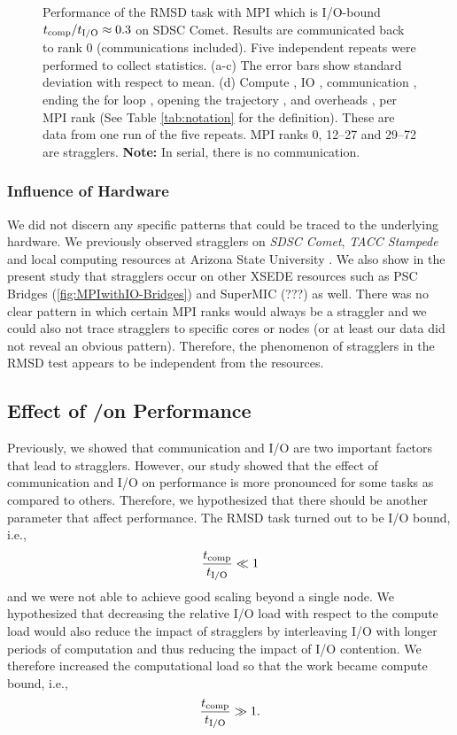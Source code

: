 \begin{figure}
\caption{Performance of the RMSD task with MPI which is I/O-bound ${t}_{\text{comp}}/{t}_{\text{I/O}} \approx 0.3$ on SDSC Comet.
Results are communicated back to rank 0 (communications included). Five independent repeats were performed to collect statistics. (a-c) The error bars show
standard deviation with respect to mean. (d) Compute \tcomp, IO \tIO, communication \tcomm, ending the for loop ,
  opening the trajectory , and overheads ,  per MPI rank (See Table \ref{tab:notation} for the definition).
These are data from one run of the five repeats. MPI ranks 0, 12--27 and 29--72 are stragglers. \textbf{Note:} In serial, there is no communication.}
\label{fig:MPIwithIO}
\end{figure} 

\subsubsection*{Influence of Hardware}
We did not discern any specific patterns that could be traced to the underlying hardware. 
We previously observed stragglers on \emph{SDSC Comet}, \emph{TACC Stampede} and local computing resources at Arizona State University \cite{Khoshlessan:2017ab}. 
We also show in the present study that stragglers occur on other XSEDE resources such as PSC Bridges (\ref{fig:MPIwithIO-Bridges}) and SuperMIC (???) as well.
There was no clear pattern in which certain MPI ranks would always be a straggler and we could also not trace stragglers to specific cores or nodes (or at least our data did not reveal an obvious pattern). 
Therefore, the phenomenon of stragglers in the RMSD test appears to be independent from the resources.

\subsection{Effect of \tcomp/\tIO on Performance}
\label{bound}

Previously, we showed that communication and I/O are two important factors that lead to stragglers. 
However, our study showed that the effect of communication and I/O on performance is more pronounced for some tasks as compared to others.
Therefore, we hypothesized that there should be another parameter that affect performance.
The RMSD task turned out to be I/O bound, i.e.,
\begin{gather*}
  \frac{{t}_{\text{comp}}}{{t}_{\text{I/O}}} \ll 1
\end{gather*}
and we were not able to achieve good scaling beyond a single node. 
We hypothesized that decreasing the relative I/O load with respect to the compute load would also reduce the impact of stragglers by interleaving I/O with longer periods of computation and thus reducing the impact of I/O contention.
We therefore increased the computational load so that the work became compute bound, i.e.,
\begin{gather*}
  \frac{{t}_{\text{comp}}}{{t}_{\text{I/O}}} \gg 1.
\end{gather*}

